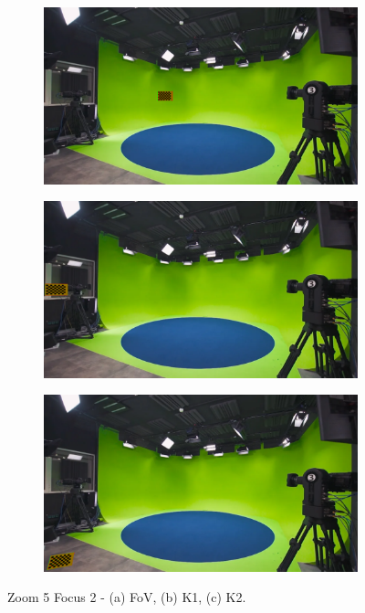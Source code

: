 \begin{figure}[h]
    \centering
    \begin{subfigure}[b]{0.45\textwidth}
        \includegraphics[width=\textwidth]{Images/08annex/results/10.2.png}
        \caption{}
        \label{fig:a2}
    \end{subfigure}
    \hfill
    \begin{subfigure}[b]{0.45\textwidth}
        \includegraphics[width=\textwidth]{Images/08annex/results/10.3.png}
        \caption{}
        \label{fig:b2}
    \end{subfigure}
    
    \vspace{0.5cm}
    
    \begin{subfigure}[b]{0.45\textwidth}
        \includegraphics[width=\textwidth]{Images/08annex/results/10.4.png}
        \caption{}
        \label{fig:c2}
    \end{subfigure}

    \caption{Zoom 5 Focus 2 - (a) FoV, (b) K1, (c) K2.}
    \label{fig:vir_fov_cal}
\end{figure}

